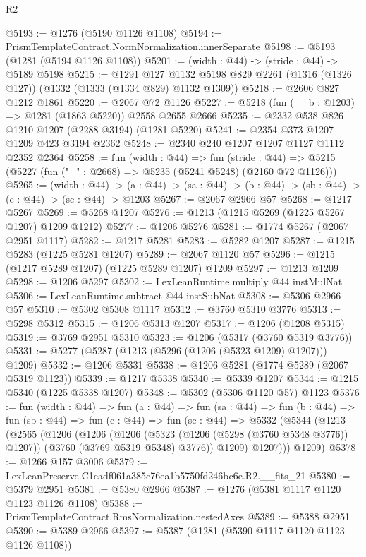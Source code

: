 \begin{lexlean}{R2}
\begin{coremodule}
@5193 := @1276 (@5190 @1126 @1108)
@5194 := PrismTemplateContract.NormNormalization.innerSeparate
@5198 := @5193 (@1281 (@5194 @1126 @1108))
@5201 := (width : @44) -> (stride : @44) -> @5189 @5198
@5215 := @1291
    @127
    @1132
    @5198
    @829
    @2261
    (@1316 (@1326 @127))
    (@1332 (@1333 (@1334 @829) @1132 @1309))
@5218 := @2606 @827 @1212 @1861
@5220 := @2067 @72 @1126
@5227 := @5218 (fun (__b : @1203) => @1281 (@1863 @5220)) @2558 @2655 @2666
@5235 := @2332 @538 @826 @1210 @1207 (@2288 @3194) (@1281 @5220)
@5241 := @2354 @373 @1207 @1209 @423 @3194 @2362
@5248 := @2340 @240 @1207 @1207 @1127 @1112 @2352 @2364
@5258 := fun (width : @44) =>
  fun (stride : @44) => @5215 (@5227 (fun ("_" : @2668) => @5235 (@5241 @5248) (@2160 @72 @1126)))
@5265 := (width : @44) ->
  (a : @44) -> (sa : @44) -> (b : @44) -> (sb : @44) -> (c : @44) -> (sc : @44) -> @1203
@5267 := @2067 @2966 @57
@5268 := @1217 @5267
@5269 := @5268 @1207
@5276 := @1213 (@1215 @5269 (@1225 @5267 @1207) @1209 @1212)
@5277 := @1206 @5276
@5281 := @1774 @5267 (@2067 @2951 @1117)
@5282 := @1217 @5281
@5283 := @5282 @1207
@5287 := @1215 @5283 (@1225 @5281 @1207)
@5289 := @2067 @1120 @57
@5296 := @1215 (@1217 @5289 @1207) (@1225 @5289 @1207) @1209
@5297 := @1213 @1209
@5298 := @1206 @5297
@5302 := LexLeanRuntime.multiply @44 instMulNat
@5306 := LexLeanRuntime.subtract @44 instSubNat
@5308 := @5306 @2966 @57
@5310 := @5302 @5308 @1117
@5312 := @3760 @5310 @3776
@5313 := @5298 @5312
@5315 := @1206 @5313 @1207
@5317 := @1206 (@1208 @5315)
@5319 := @3769 @2951 @5310
@5323 := @1206 (@5317 (@3760 @5319 @3776))
@5331 := @5277 (@5287 (@1213 (@5296 (@1206 (@5323 @1209) @1207))) @1209)
@5332 := @1206 @5331
@5338 := @1206 @5281 (@1774 @5289 (@2067 @5319 @1123))
@5339 := @1217 @5338
@5340 := @5339 @1207
@5344 := @1215 @5340 (@1225 @5338 @1207)
@5348 := @5302 (@5306 @1120 @57) @1123
@5376 := fun (width : @44) =>
  fun (a : @44) =>
  fun (sa : @44) =>
  fun (b : @44) =>
  fun (sb : @44) =>
  fun (c : @44) =>
  fun (sc : @44) =>
  @5332
    (@5344
      (@1213
        (@2565
          (@1206
            (@1206
              (@1206
                (@5323 (@1206 (@5298 (@3760 @5348 @3776)) @1207))
                (@3760 (@3769 @5319 @5348) @3776))
              @1209)
            @1207)))
      @1209)
@5378 := @1266 @157 @3006
@5379 := LexLeanPreserve.C1cadf061a385c76ea1b5750fd246bc6e.R2.__fits_21
@5380 := @5379 @2951
@5381 := @5380 @2966
@5387 := @1276 (@5381 @1117 @1120 @1123 @1126 @1108)
@5388 := PrismTemplateContract.RmsNormalization.nestedAxes
@5389 := @5388 @2951
@5390 := @5389 @2966
@5397 := @5387 (@1281 (@5390 @1117 @1120 @1123 @1126 @1108))

\end{coremodule}
\end{lexlean}
